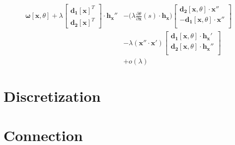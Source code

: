 	\begin{align}
        		\boldsymbol{\omega}[\boldsymbol{x},\theta] +
        		\lambda
        		\left[\begin{array}{c}
        		\boldsymbol{d_1}[\boldsymbol{x}]^T \\
        		\boldsymbol{d_2}[\boldsymbol{x}]^T
        		\end{array}\right] \cdot \boldsymbol{h_x}'' 
        		& -
        		\big(\lambda\frac{\partial \theta}{\partial \boldsymbol{x}}(s) \cdot \boldsymbol{h_x}\big)
        		\left[\begin{array}{c}
        		\boldsymbol{d_2}[\boldsymbol{x},\theta]\cdot \boldsymbol{x}''\\
        		-\boldsymbol{d_1}[\boldsymbol{x},\theta]\cdot \boldsymbol{x}''\\
        		\end{array}\right] \\
        		& - 
        		\lambda(\boldsymbol{x}'' \cdot \boldsymbol{x}')
        		\left[\begin{array}{c}
        		\boldsymbol{d_1}[\boldsymbol{x},\theta]\cdot \boldsymbol{h_x}'\\
        		\boldsymbol{d_2}[\boldsymbol{x},\theta]\cdot \boldsymbol{h_x}''\\
        		\end{array}\right] \\
        		& + o(\lambda)
	\end{align}

\section{Discretization}




\section{Connection}



